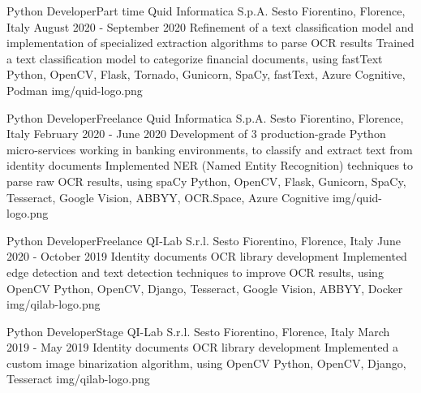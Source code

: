 
\begin{cventries}

  \logocventry
    {Python Developer{\enskip\cdotp\enskip}Part time}
    {Quid Informatica S.p.A.}
    {Sesto Fiorentino, Florence, Italy}
    {August 2020 - September 2020}
    {
      \cvexp
        {Refinement of a text classification model and implementation of specialized extraction algorithms to parse OCR results}
        {Trained a text classification model to categorize financial documents, using fastText}
        {Python, OpenCV, Flask, Tornado, Gunicorn, SpaCy, fastText, Azure Cognitive, Podman}
    }
    {img/quid-logo.png}

  \logocventry
    {Python Developer{\enskip\cdotp\enskip}Freelance}
    {Quid Informatica S.p.A.}
    {Sesto Fiorentino, Florence, Italy}
    {February 2020 - June 2020}
    {
      \cvexp
        {Development of 3 production-grade Python micro-services working in banking environments, to classify and extract text from identity documents}
        {Implemented NER (Named Entity Recognition) techniques to parse raw OCR results, using spaCy}
        {Python, OpenCV, Flask, Gunicorn, SpaCy, Tesseract, Google Vision, ABBYY, OCR.Space, Azure Cognitive}
    }
    {img/quid-logo.png}

  \logocventry
    {Python Developer{\enskip\cdotp\enskip}Freelance}
    {QI-Lab S.r.l.}
    {Sesto Fiorentino, Florence, Italy}
    {June 2020 - October 2019}
    {
      \cvexp
        {Identity documents OCR library development}
        {Implemented edge detection and text detection techniques to improve OCR results, using OpenCV}
        {Python, OpenCV, Django, Tesseract, Google Vision, ABBYY, Docker}
    }
    {img/qilab-logo.png}
  
  \logocventry
    {Python Developer{\enskip\cdotp\enskip}Stage}
    {QI-Lab S.r.l.}
    {Sesto Fiorentino, Florence, Italy}
    {March 2019 - May 2019}
    {
      \cvexp
        {Identity documents OCR library development}
        {Implemented a custom image binarization algorithm, using OpenCV}
        {Python, OpenCV, Django, Tesseract}
    }
    {img/qilab-logo.png}


\end{cventries}
